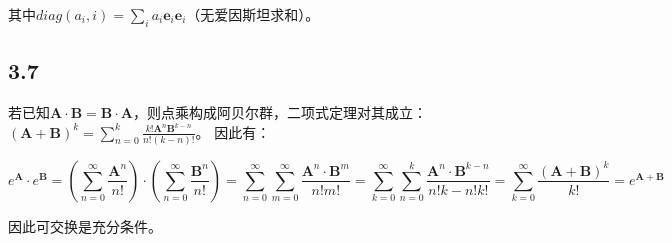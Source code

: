 \documentclass[UTF8,zihao=5]{ctexart}
\newcommand{\bm}[1]{{\mathbf{#1}}}
\newcommand{\trans}[0]{^\mathrm{T}}
\begin{document}
其中$diag(a_i, i)=\sum_i a_i\bm{e}_i\bm{e}_i$（无爱因斯坦求和）。

\subsection*{3.7}

若已知$\bm{A}\cdot\bm{B}=\bm{B}\cdot\bm{A}$，则点乘构成阿贝尔群，二项式定理对其成立：
$(\bm{A}+\bm{B})^k=\sum_{n=0}^k\frac{k!\bm{A}^n\bm{B}^{k-n}}{n!(k-n)!}$。
因此有：

$$
e^{\bm{A}}\cdot e^\bm{B}
=\left(\sum_{n=0}^\infty\frac{\bm{A}^n}{n!}\right)\cdot
\left(\sum_{n=0}^\infty\frac{\bm{B}^n}{n!}\right)
=\sum_{n=0}^\infty\sum_{m=0}^\infty\frac{\bm{A}^n\cdot\bm{B}^m}{n!m!}
=\sum_{k=0}^\infty\sum_{n=0}^k\frac{\bm{A}^n\cdot\bm{B}^{k-n}}{n!{k-n}!k!}
=\sum_{k=0}^\infty\frac{(\bm{A}+\bm{B})^k}{k!}
=e^{\bm{A}+\bm{B}}
$$

因此可交换是充分条件。







\end{document}
